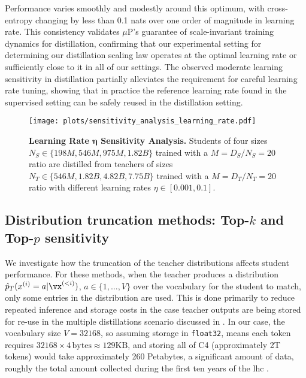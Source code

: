 Performance varies smoothly and modestly around this optimum, with cross-entropy changing by less than 0.1 nats over one order of magnitude in learning rate.
This consistency validates $\mu$P's guarantee of scale-invariant training dynamics for distillation, confirming that our experimental setting for determining our distillation scaling law operates at the optimal learning rate or sufficiently close to it in all of our settings.
The observed moderate learning sensitivity in distillation partially alleviates the requirement for careful learning rate tuning,
showing that in practice the reference learning rate found in the supervised setting can be safely reused in the distillation setting.
\begin{figure}[h]
	\centering
        \vspace{-0.12cm}
	\texttt{[image: plots/sensitivity\_analysis\_learning\_rate.pdf]}
        \vspace{-0.12cm}
	\caption{\textbf{Learning Rate $\bm \eta$ Sensitivity Analysis.} Students of four sizes $N_S\in\{198M,546M,975M,1.82B\}$ trained with a $M=D_S/N_S=20$ ratio are distilled from teachers of sizes $N_T\in\{546M, 1.82B,4.82B,7.75B\}$ trained with a $M=D_T/N_T=20$ ratio with different learning rates $\eta\in[0.001,0.1]$.}
        \vspace{-0.15cm}
	\label{fig:sensitivity-analysis-learning-rate}
\end{figure}

\FloatBarrier


\subsection{Distribution truncation methods: Top-\texorpdfstring{$k$}{k} and Top-\texorpdfstring{$p$}{p} sensitivity}
\label{ssec:top-k-top-p-sensitivity}

We investigate how the truncation of the teacher distributions affects student performance.
For these methods,
when the teacher produces a distribution $\hat p_T(x^{(i)}=a|\vx^{(<i)})$, $a\in\{1,\ldots,V\}$ over the vocabulary for the student to match,
only some entries in the distribution are used.
This is done primarily to reduce repeated inference and storage costs in the case teacher outputs are being stored for re-use in the multiple distillations scenario discussed in
.
In our case, the vocabulary size $V=32168$,
so assuming storage in \texttt{float32}, means each token requires $32168\times 4 \,\mathrm{bytes}\approx 129\mathrm{KB}$,
and storing all of C4 (approximately 2T tokens)
would take approximately 260 Petabytes,
a significant amount of data, roughly the total amount collected during the first
ten years of the \gls{lhc} \citep{CERNDataCentre2018}.

